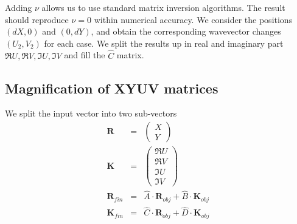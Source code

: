 \documentclass[12pt,a4paper,twoside,openright,BCOR10mm,headsepline,titlepage,abstracton,chapterprefix,final]{scrreprt}
\newcommand\Vector[1]{{\mathbf{#1}}}
\begin{document}
Adding $\nu$ allows us to use standard matrix inversion algorithms.
The result should reproduce $\nu=0$ within numerical accuracy.
We consider the positions $(dX,0)$ and $(0,dY)$, and obtain the corresponding wavevector changes $(U_2,V_2)$ for each case.
We split the results up in real and imaginary part $\Re U, \Re V, \Im U, \Im V$ and fill the $\hat{C}$ matrix.

\subsection{Magnification of XYUV matrices}

We split the input vector into two sub-vectors
\begin{eqnarray}
 \Vector{R} &=&
 \begin{pmatrix}
  X \\ Y
 \end{pmatrix}
 \\
 \Vector{K} &=&
 \begin{pmatrix}
  \Re U \\ \Re V \\ \Im U \\ \Im V 
 \end{pmatrix}
 \\
 \Vector{R}_{fin} &=& \hat{A} \cdot \Vector{R}_{obj} + \hat{B} \cdot \Vector{K}_{obj} \\
 \Vector{K}_{fin} &=& \hat{C} \cdot \Vector{R}_{obj} + \hat{D} \cdot \Vector{K}_{obj} 
\end{eqnarray}
\end{document}
